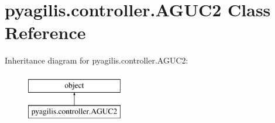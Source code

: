 \hypertarget{classpyagilis_1_1controller_1_1_a_g_u_c2}{}\section{pyagilis.\+controller.\+A\+G\+U\+C2 Class Reference}
\label{classpyagilis_1_1controller_1_1_a_g_u_c2}
Inheritance diagram for pyagilis.\+controller.\+A\+G\+U\+C2\+:\begin{figure}[H]
\begin{center}
\leavevmode
\includegraphics[height=2.000000cm]{classpyagilis_1_1controller_1_1_a_g_u_c2}
\end{center}
\end{figure}
